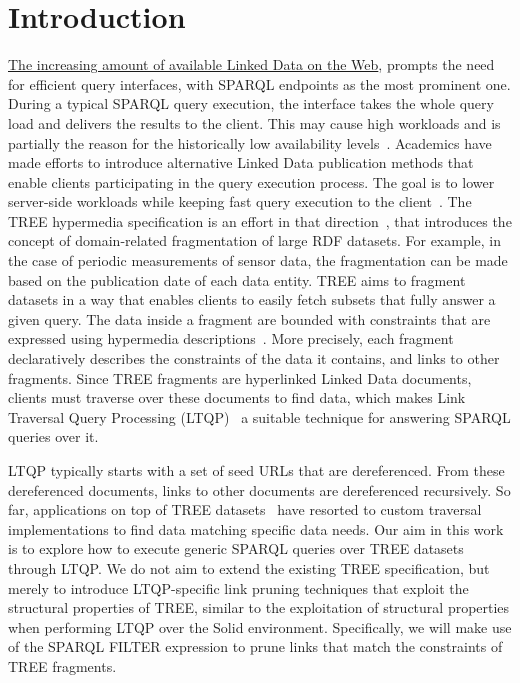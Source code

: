 \section{Introduction}

\href{https://lod-cloud.net/#diagram}{The increasing amount of available Linked Data on the Web},
prompts the need for efficient query interfaces, with SPARQL endpoints as the most prominent one.
During a typical SPARQL query execution, the interface takes the whole query load and delivers the results to the client.
This may cause high workloads and is partially the reason for the historically low
availability levels~\cite{aranda2013}.
Academics have made efforts to introduce alternative Linked Data publication methods
that enable clients participating in the query execution process.
The goal is to lower server-side workloads while keeping fast query execution to the client~\cite{Azzam2021}.
The TREE hypermedia specification is an effort in that direction~\cite{ColpaertMaterializedTREE, lancker2021LDS},
that introduces the concept of domain-related fragmentation of large RDF datasets.
For example, in the case of periodic measurements of sensor data,
the fragmentation can be made based on the publication date of each data entity.
TREE aims to fragment datasets in a way that enables clients to easily fetch subsets that fully answer a given query.
The data inside a fragment are bounded with constraints that are expressed using hypermedia descriptions~\cite{thomasFieldingPhdThesis}.
More precisely, each fragment declaratively describes the constraints of the data it contains, and links to other fragments.
Since TREE fragments are hyperlinked Linked Data documents,
clients must traverse over these documents to find data,
which makes Link Traversal Query Processing (LTQP)~\cite{Hartig2016} a suitable technique for answering SPARQL queries over it.

LTQP typically starts with a set of seed URLs that are dereferenced.
From these dereferenced documents, links to other documents are dereferenced recursively.
So far, applications on top of TREE datasets~\cite{ColpaertMaterializedTREE, lancker2021LDS}
have resorted to custom traversal implementations to find data matching specific data needs.
Our aim in this work is to explore how to execute generic SPARQL queries over TREE datasets through LTQP.
We do not aim to extend the existing TREE specification,
but merely to introduce LTQP-specific link pruning techniques that exploit the structural properties of TREE,
similar to the exploitation of structural properties when performing LTQP over the Solid environment\cite{taelman2023}.
Specifically, we will make use of the SPARQL FILTER expression to prune links that match the constraints of TREE fragments.

